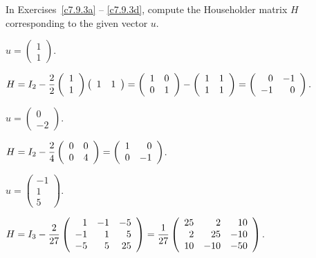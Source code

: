 \documentclass{ximera}
\begin{document}
\noindent In Exercises~\ref{c7.9.3a} -- \ref{c7.9.3d}, compute the
Householder matrix $H$ corresponding to the given vector $u$.
\begin{exercise} \label{c7.9.3a}
$u = \left(\begin{array}{r} 1\\ 1 \end{array}\right)$.

\begin{solution}

$H = I_2 - \displaystyle\frac{2}{2}\left(\begin{array}{r} 1 \\ 1\end{array}\right)\left(\begin{array}{rr} 1 & 1
\end{array}\right) = \left(\begin{array}{rr} 1 & 0\\ 0 &1\end{array}\right) - \left(\begin{array}{rr} 1 & 1\\ 1 &1\end{array}\right)
= \left(\begin{array}{rr} 0 & -1\\ -1 &0\end{array}\right).$

\end{solution}
\end{exercise}
\begin{exercise} \label{c7.9.3b}
$u = \left(\begin{array}{r} 0\\ -2 \end{array}\right)$.

\begin{solution}

$H = I_2 - \displaystyle\frac{2}{4}\left(\begin{array}{rr} 0 & 0\\ 0 &4\end{array}\right) =
\left(\begin{array}{rr} 1 & 0\\ 0 &-1\end{array}\right)$.

\end{solution}
\end{exercise}
\begin{exercise} \label{c7.9.3c}
$u = \left(\begin{array}{r} -1\\ 1 \\5\end{array}\right)$.

\begin{solution}

$H = I_3 - \displaystyle\frac{2}{27}\left(\begin{array}{rrr} 1 & -1 & -5 \\ -1 & 1 & 5 \\ -5 & 5 & 25\end{array}\right)
= \frac{1}{27}\left(\begin{array}{rrr} 25 & 2 & 10 \\ 2 & 25 & -10 \\ 10 & -10 & -50\end{array}\right)$.

\end{solution}
\end{exercise}
\end{document}
